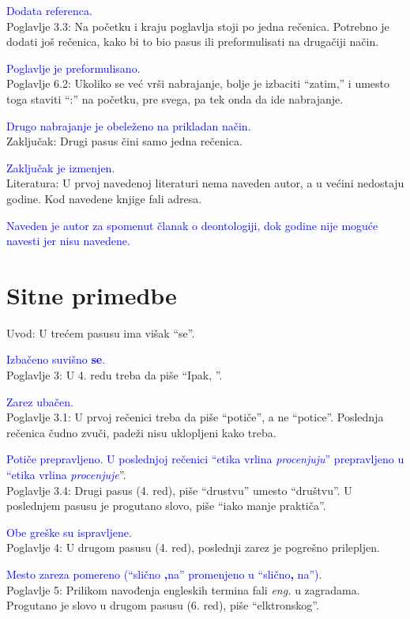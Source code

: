 \documentclass[a4paper]{report}
\newcommand{\odgovor}[1]{\textcolor{blue}{#1}}
\begin{document}
\odgovor{Dodata referenca.}
\\\textbullet Poglavlje 3.3: Na početku i kraju poglavlja stoji po jedna rečenica. Potrebno je dodati još rečenica, kako bi to bio pasus ili preformulisati na drugačiji način.

\odgovor{Poglavlje je preformulisano.}
\\\textbullet Poglavlje 6.2: Ukoliko se već vrši nabrajanje, bolje je izbaciti “zatim,” i umesto toga staviti “:” na početku, pre svega, pa tek onda da ide nabrajanje.

\odgovor{Drugo nabrajanje je obeleženo na prikladan način. }
\\\textbullet Zaključak: Drugi pasus čini samo jedna rečenica.

\odgovor{Zaključak je izmenjen.}
\\\textbullet Literatura: U prvoj navedenoj literaturi nema naveden autor, a u većini nedostaju godine. Kod navedene knjige fali adresa.

\odgovor{Naveden je autor za spomenut članak o deontologiji, dok godine nije moguće navesti jer nisu navedene.}

\section{Sitne primedbe}
\textbullet Uvod: U trećem pasusu ima višak “se”.

\odgovor{Izbačeno suvišno \textbf{se}.}
\\\textbullet Poglavlje 3: U 4. redu treba da piše “Ipak, ”.

\odgovor{Zarez ubačen.}
\\\textbullet Poglavlje 3.1: U prvoj rečenici treba da piše “potiče”, a ne “potice”. Poslednja rečenica čudno zvuči, padeži nisu uklopljeni kako treba.

\odgovor{Potiče prepravljeno. U poslednjoj rečenici ``etika vrlina \textit{procenjuju}'' prepravljeno u ``etika vrlina \textit{procenjuje}}''.
\\\textbullet Poglavlje 3.4: Drugi pasus (4. red), piše “drustvu” umesto “društvu”. U poslednjem pasusu je progutano slovo, piše “iako manje praktiča”.

\odgovor{Obe greške su ispravljene.}
\\\textbullet Poglavlje 4: U drugom pasusu (4. red), poslednji zarez je pogrešno prilepljen.

\odgovor{Mesto zareza pomereno (``slično \textbf{,}na'' promenjeno u ``slično\textbf{,} na'').}
\\\textbullet Poglavlje 5: Prilikom navođenja engleskih termina fali \textit{eng.} u zagradama.
	Progutano je slovo u drugom pasusu (6. red), piše “elktronskog”.
	
\end{document}

